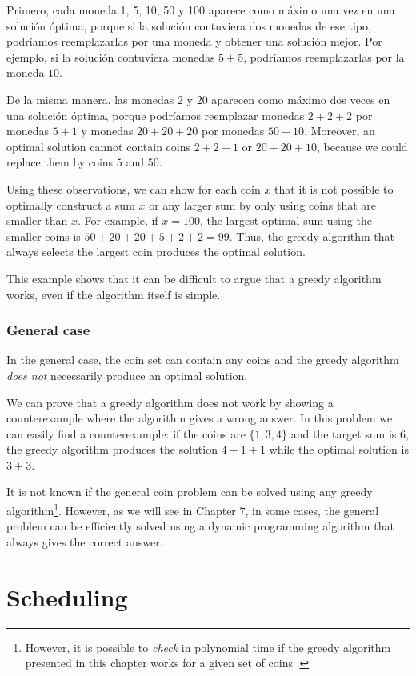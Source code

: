Primero, cada moneda 1, 5, 10, 50 y 100 aparece
como máximo una vez en una solución óptima,
porque si la
solución contuviera dos monedas de ese tipo,
podríamos reemplazarlas por una moneda y
obtener una solución mejor.
Por ejemplo, si la solución contuviera
monedas $5+5$, podríamos reemplazarlas por la moneda $10$.

De la misma manera, las monedas 2 y 20 aparecen
como máximo dos veces en una solución óptima,
porque podríamos reemplazar
monedas $2+2+2$ por monedas $5+1$ y
monedas $20+20+20$ por monedas $50+10$.
Moreover, an optimal solution cannot contain
coins $2+2+1$ or $20+20+10$,
because we could replace them by coins $5$ and $50$.

Using these observations,
we can show for each coin $x$ that
it is not possible to optimally construct
a sum $x$ or any larger sum by only using coins
that are smaller than $x$.
For example, if $x=100$, the largest optimal
sum using the smaller coins is  $50+20+20+5+2+2=99$.
Thus, the greedy algorithm that always selects
the largest coin produces the optimal solution.

This example shows that it can be difficult
to argue that a greedy algorithm works,
even if the algorithm itself is simple.

\subsubsection{General case}

In the general case, the coin set can contain any coins
and the greedy algorithm \emph{does not} necessarily produce
an optimal solution.

We can prove that a greedy algorithm does not work
by showing a counterexample
where the algorithm gives a wrong answer.
In this problem we can easily find a counterexample:
if the coins are $\{1,3,4\}$ and the target sum
is 6, the greedy algorithm produces the solution
$4+1+1$ while the optimal solution is $3+3$.

It is not known if the general coin problem
can be solved using any greedy algorithm\footnote{However, it is possible
to \emph{check} in polynomial time
if the greedy algorithm presented in this chapter works for
a given set of coins \cite{pea05}.}.
However, as we will see in Chapter 7,
in some cases,
the general problem can be efficiently
solved using a dynamic
programming algorithm that always gives the
correct answer.

\section{Scheduling}

